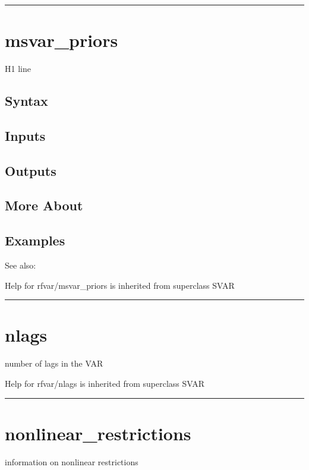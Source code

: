 \documentclass[letterpaper,10pt,english]{sphinxmanual}
\begin{document}
\bigskip\hrule{}\bigskip



\section{msvar\_priors}
\label{classes/models/@rfvar/rfvar:id81}\label{classes/models/@rfvar/rfvar:msvar-priors}
H1 line


\subsection{Syntax}
\label{classes/models/@rfvar/rfvar:id82}

\subsection{Inputs}
\label{classes/models/@rfvar/rfvar:id83}

\subsection{Outputs}
\label{classes/models/@rfvar/rfvar:id84}

\subsection{More About}
\label{classes/models/@rfvar/rfvar:id85}

\subsection{Examples}
\label{classes/models/@rfvar/rfvar:id86}
See also:

Help for rfvar/msvar\_priors is inherited from superclass SVAR


\bigskip\hrule{}\bigskip



\section{nlags}
\label{classes/models/@rfvar/rfvar:id87}\label{classes/models/@rfvar/rfvar:nlags}
number of lags in the VAR

Help for rfvar/nlags is inherited from superclass SVAR


\bigskip\hrule{}\bigskip



\section{nonlinear\_restrictions}
\label{classes/models/@rfvar/rfvar:id88}\label{classes/models/@rfvar/rfvar:nonlinear-restrictions}
information on nonlinear restrictions
\end{document}
